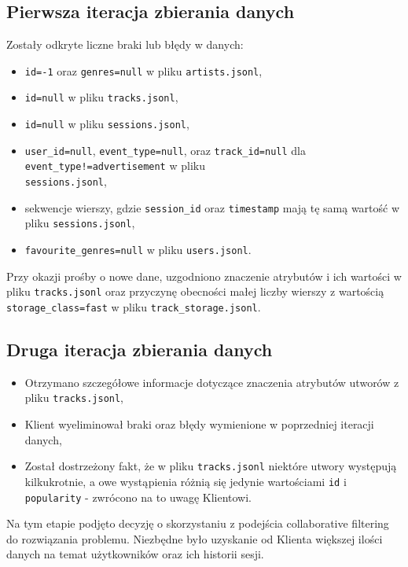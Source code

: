 \documentclass[10pt,a4paper]{article}
\begin{document}
\subsection{Pierwsza iteracja zbierania danych}
Zostały odkryte liczne braki lub błędy w danych:
\begin{itemize}
\item \texttt{id=-1} oraz \texttt{genres=null} w pliku \texttt{artists.jsonl},
\item \texttt{id=null} w pliku \texttt{tracks.jsonl},
\item \texttt{id=null} w pliku \texttt{sessions.jsonl},
\item \texttt{user\_id=null}, \texttt{event\_type=null}, oraz \texttt{track\_id=null} dla \texttt{event\_type!=advertisement} w pliku\\ \texttt{sessions.jsonl},
\item sekwencje wierszy, gdzie \texttt{session\_id} oraz \texttt{timestamp} mają tę samą wartość w pliku \texttt{sessions.jsonl},
\item \texttt{favourite\_genres=null} w pliku \texttt{users.jsonl}.

\end{itemize}

Przy okazji prośby o nowe dane, uzgodniono znaczenie atrybutów i ich wartości w pliku \texttt{tracks.jsonl} oraz przyczynę obecności małej liczby wierszy z wartością \texttt{storage\_class=fast} w pliku \texttt{track\_storage.jsonl}.

\subsection{Druga iteracja zbierania danych}
\begin{itemize}
\item Otrzymano szczegółowe informacje dotyczące znaczenia atrybutów utworów z pliku \texttt{tracks.jsonl},
\item Klient wyeliminował braki oraz błędy wymienione w poprzedniej iteracji danych,
\item Został dostrzeżony fakt, że w pliku \texttt{tracks.jsonl} niektóre utwory występują kilkukrotnie, a owe wystąpienia różnią się jedynie wartościami \texttt{id} i \texttt{popularity} - zwrócono na to uwagę Klientowi.

\end{itemize}

Na tym etapie podjęto decyzję o skorzystaniu z podejścia collaborative filtering do rozwiązania problemu. Niezbędne było uzyskanie od Klienta większej ilości danych na temat użytkowników oraz ich historii sesji.
\end{document}
